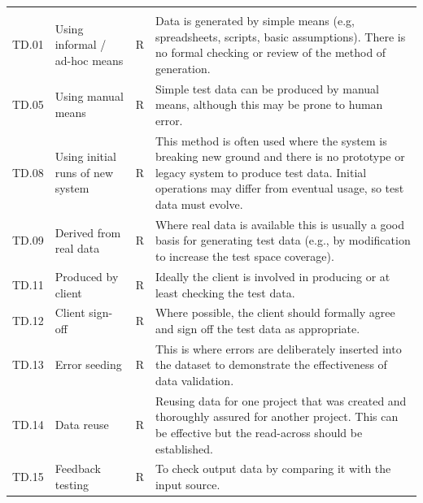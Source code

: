 \begin{longtable*}{|C{}|L{}|C{}|L{}|}
  \hline{} &  &  & \\\hline
  \endfirsthead
  \hline{} &  &  & \\\hline
  \endhead
  \endfoot\endlastfoot
   TD.01 & Using informal / ad-hoc means & R & Data is generated by simple means (e.g, spreadsheets, scripts, basic assumptions). There is no formal checking or review of the method of generation.\\
  \hline
   TD.05 & Using manual means & R & Simple test data can be produced by manual means, although this may be prone to human error.\\
  \hline
   TD.08 & Using initial runs of new system & R & This method is often used where the system is breaking new ground and there is no prototype or legacy system to produce test data. Initial operations may differ from eventual usage, so test data must evolve.\\
  \hline
   TD.09 & Derived from real data & R & Where real data is available this is usually a good basis for generating test data (e.g., by modification to increase the test space coverage).\\
  \hline
   TD.11 & Produced by client & R & Ideally the client is involved in producing or at least checking the test data.\\
  \hline
   TD.12 & Client sign-off & R & Where possible, the client should formally agree and sign off the test data as appropriate.\\
  \hline
   TD.13 & Error seeding & R & This is where errors are deliberately inserted into the \gls{dataset} to demonstrate the effectiveness of data \gls{validation}.\\
  \hline
   TD.14 & Data reuse & R & Reusing data for one project that was created and thoroughly assured for another project. This can be effective but the read-across should be established.\\
  \hline
   TD.15 & Feedback testing & R & To check output data by comparing it with the input source.\\
  \hline
\end{longtable*}

